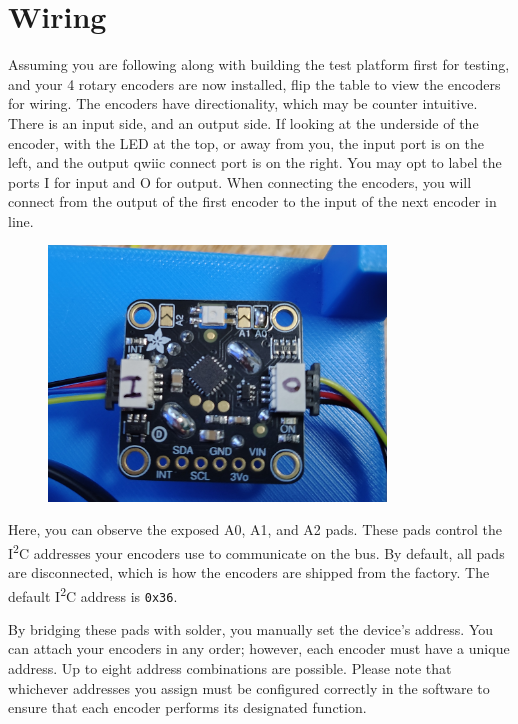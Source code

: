 \documentclass[]{article}
\begin{document}
\section*{Wiring}
Assuming you are following along with building the test platform first for testing, and your 4 rotary encoders are now installed, flip the table to view the encoders for wiring.
The encoders have directionality, which may be counter intuitive. There is an input side, and an output side. If looking at the underside of the encoder, with the LED at the top, or away from you, the input port is on the left, and the output qwiic connect port is on the right. You may opt to label the ports I for input and O for output. When connecting the encoders, you will connect from the output of the first encoder to the input of the next encoder in line. 
\begin{figure}[ht]
	\centering
	\includegraphics[width=0.8\textwidth]{underside.png}
	\label{fig:encoder_underside}
\end{figure}
Here, you can observe the exposed A0, A1, and A2 pads. These pads control the I\textsuperscript{2}C addresses your encoders use to communicate on the bus. 
By default, all pads are disconnected, which is how the encoders are shipped from the factory. The default I\textsuperscript{2}C address is \texttt{0x36}.

By bridging these pads with solder, you manually set the device's address. You can attach your encoders in any order; however, each encoder must have a unique address. Up to eight address combinations are possible.
Please note that whichever addresses you assign must be configured correctly in the software to ensure that each encoder performs its designated function.
 
\end{document}
